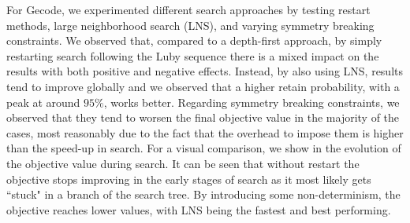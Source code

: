 For Gecode, we experimented different search approaches by testing restart methods, large neighborhood search (LNS), and varying symmetry breaking constraints. We observed that, compared to a depth-first approach, by simply restarting search following the Luby sequence there is a mixed impact on the results with both positive and negative effects. Instead, by also using LNS, results tend to improve globally and we observed that a higher retain probability, with a peak at around $95\%$, works better. Regarding symmetry breaking constraints, we observed that they tend to worsen the final objective value in the majority of the cases, most reasonably due to the fact that the overhead to impose them is higher than the speed-up in search. For a visual comparison, we show in  the evolution of the objective value during search. It can be seen that without restart the objective stops improving in the early stages of search as it most likely gets ``stuck" in a branch of the search tree. By introducing some non-determinism, the objective reaches lower values, with LNS being the fastest and best performing.


